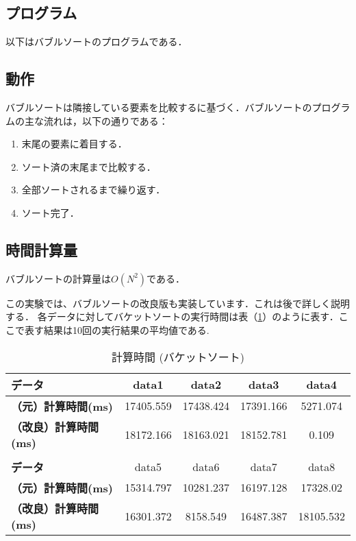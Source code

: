 \documentclass[a4j, titlepage]{jarticle}
\begin{document}
        \subsection{プログラム}
            以下はバブルソートのプログラムである．
            

        \subsection{動作}
            バブルソートは隣接している要素を比較するに基づく．バブルソートのプログラムの主な流れは，以下の通りである：
            \begin{enumerate}
                \item 末尾の要素に着目する．
                \item ソート済の末尾まで比較する．
                \item 全部ソートされるまで繰り返す．
                \item ソート完了．
            \end{enumerate}

        \subsection{時間計算量}
            バブルソートの計算量は$ O(N^2) $である．

            この実験では、バブルソートの改良版も実装しています．これは後で詳しく説明する．
            各データに対してバケットソートの実行時間は表（\ref{tab:bubble}）のように表す．ここで表す結果は10回の実行結果の平均値である.

            \begin{table}[tbh]
                \caption{計算時間 (バケットソート)}
                \label{tab:bubble}
                \begin{center}
                    \begin{tabular}{lcccc}
                        \hline
                        \textbf{データ} & data1 & data2 &data3 &data4 \\ \hline
                        \textbf{（元）計算時間(ms)} & 17405.559 & 17438.424 & 17391.166 & \cellcolor{green!20}5271.074\\ \hline
                        \textbf{（改良）計算時間(ms)} & 18172.166 & 18163.021 & 18152.781 & \cellcolor{green!20}0.109\\ \hline
                        \\ \hline
                        \textbf{データ} & data5 &data6 &data7 &data8\\ \hline
                        \textbf{（元）計算時間(ms)} & 15314.797 & \cellcolor{green!20}10281.237 & 16197.128 & 17328.02\\ \hline
                        \textbf{（改良）計算時間(ms)} & 16301.372 & \cellcolor{green!20}8158.549 & 16487.387 & 18105.532\\ \hline
                    \end{tabular}
                \end{center}
            \end{table}
        
\end{document}

